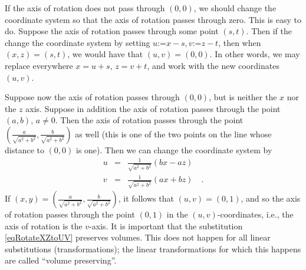 \documentclass[12pt]{book}
\newcommand{\eqdef}{\textbf{:=}}
\begin{document}
If the axis of rotation does not pass through $(0,0)$, we should change the coordinate system so that the axis of rotation passes through zero. This is easy to do. Suppose the axis of rotation passes through some point $(s,t)$. Then if the change the coordinate system by setting $u\eqdef x-s, v\eqdef z-t$, then when $(x,z)=(s,t)$, we would have that $(u,v)=(0,0)$. In other words, we may replace everywhere $x=u+s$, $z=v+t$, and work with the new coordinates $(u,v)$.

Suppose now the axis of rotation passes through $(0,0)$, but is neither the $x$ nor the $z$ axis. Suppose in addition the axis of rotation passes through the point $(a,b)$, $a\neq 0$. Then the axis of rotation passes through the point $(\frac{a}{\sqrt{a^2+b^2}},\frac{b}{\sqrt{a^2+b^2}})$ as well (this is one of the two points on the line whose distance to $(0,0)$ is one). Then we can change the coordinate system by 
\begin{equation}\label{eqRotateXZtoUV}
\begin{array}{rcl}
u &=&\frac{1}{\sqrt{a^2+b^2}}\left( bx-az\right)\\
v &=& \frac{1}{\sqrt{a^2+b^2}}\left( ax+bz\right)\quad .
\end{array}
\end{equation}
If $(x,y)= (\frac{a}{\sqrt{a^2+b^2}}, \frac{b}{ \sqrt{a^2 +b^2}})$, it follows that $(u,v)=(0,1)$, and so the axis of rotation passes through the point $(0,1)$ in the $(u,v)$-coordinates, i.e., the axis of rotation is the $v$-axis. It is important that the substitution \eqref{eqRotateXZtoUV} preserves volumes. This does not happen for all linear substitutions (transformations); the linear transformations for which this happens are called ``volume preserving''. 
\end{document}
